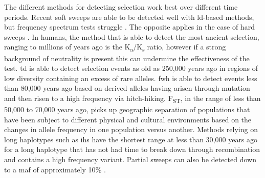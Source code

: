 \documentclass[]{report}
\begin{document}
The different methods for detecting selection work best over different
time periods. Recent soft sweeps are able to be detected well with
\gls{ld}-based methods, but frequency spectrum tests struggle
\citep{Hermisson2005}. The opposite applies in the case of hard sweeps
\citep{Hermisson2005}. In humans, the method that is able to detect the
most ancient selection, ranging to millions of years ago is the
K\textsubscript{a}/K\textsubscript{s} ratio, however if a strong
background of neutrality is present this can undermine the effectiveness
of the test. \Gls{td} is able to detect selection events as old as
250,000 years ago in regions of low diversity containing an excess of
rare alleles. \Gls{fwh} is able to detect events less than 80,000 years
ago based on derived alleles having arisen through mutation and then
risen to a high frequency via hitch-hiking. F\textsubscript{ST}, in the
range of less than 50,000 to 70,000 years ago, picks up geographic
separation of populations that have been subject to different physical
and cultural environments based on the changes in allele frequency in
one population versus another. Methods relying on long haplotypes such
as \gls{ihs} have the shortest range at less than 30,000 years ago for a
long haplotype that has not had time to break down through recombination
and contains a high frequency variant. Partial sweeps can also be
detected down to a \gls{maf} of approximately 10\%
\citep{sabeti2006positive}.
\end{document}

